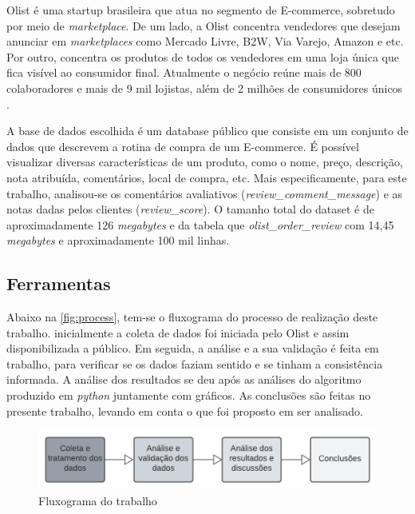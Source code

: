 Olist é uma startup brasileira que atua no segmento de E-commerce, sobretudo por meio de \textit{marketplace}. De um lado, a Olist concentra vendedores que desejam anunciar em \textit{marketplaces} como Mercado Livre, B2W, Via Varejo, Amazon e etc. Por outro, concentra os produtos de todos os vendedores em uma loja única que fica visível ao consumidor final. Atualmente o negócio reúne mais de 800 colaboradores e mais de 9 mil lojistas, além de 2 milhões de consumidores únicos \citep{Olist}.

A base de dados escolhida é um database público que consiste em um conjunto de dados que descrevem a rotina de compra de um E-commerce. É possível visualizar diversas características de um produto, como o nome, preço, descrição, nota atribuída, comentários, local de compra, etc. Mais especificamente, para este trabalho, analisou-se os comentários avaliativos (\textit{review\_comment\_message}) e as notas dadas pelos clientes (\textit{review\_score}). O tamanho total do dataset é de aproximadamente 126 \textit{megabytes} e da tabela que \textit{olist\_order\_review} com  14,45 \textit{megabytes} e aproximadamente 100 mil linhas.

\subsection{Ferramentas}

Abaixo na \autoref{fig:process}, tem-se o fluxograma do processo de realização deste trabalho. inicialmente a coleta de dados foi iniciada pelo Olist e assim disponibilizada a público. Em seguida, a análise e a sua validação é feita em trabalho, para verificar se os dados faziam sentido e se tinham a consistência informada. A análise dos resultados se deu após as análises do algoritmo produzido em \textit{python} juntamente com gráficos. As conclusões são feitas no presente trabalho, levando em conta o que foi proposto em ser analisado.

\begin{figure}[H]
    \centering
    \includegraphics[width=\linewidth, scale=0.6]{./figs/process_diagram.png}
    \caption{Fluxograma do trabalho}
    \label{fig:process}
\end{figure}

